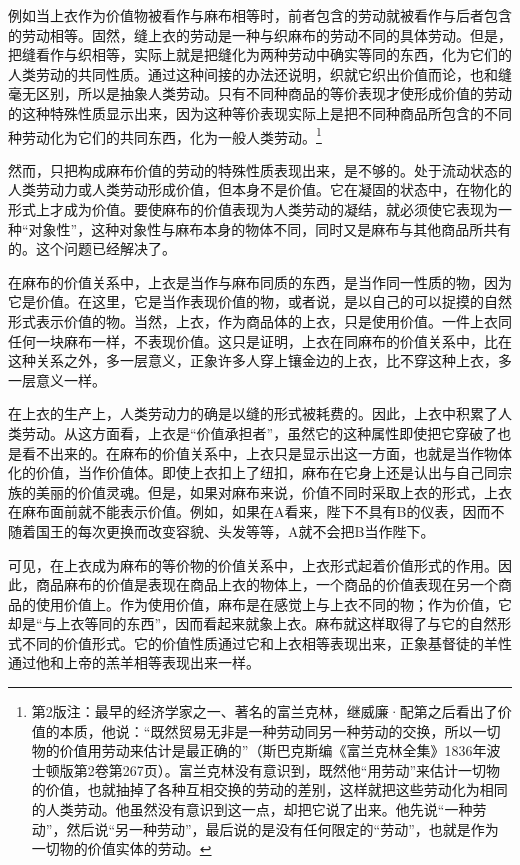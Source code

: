 \documentclass{ctexbook}
\begin{document}
                例如当上衣作为价值物被看作与麻布相等时，前者包含的劳动就被看作与后者包含的劳动相等。固然，缝上衣的劳动是一种与织麻布的劳动不同的具体劳动。但是，把缝看作与织相等，实际上就是把缝化为两种劳动中确实等同的东西，化为它们的人类劳动的共同性质。通过这种间接的办法还说明，织就它织出价值而论，也和缝毫无区别，所以是抽象人类劳动。只有不同种商品的等价表现才使形成价值的劳动的这种特殊性质显示出来，因为这种等价表现实际上是把不同种商品所包含的不同种劳动化为它们的共同东西，化为一般人类劳动。\footnote{第2版注：最早的经济学家之一、著名的富兰克林，继威廉·配第之后看出了价值的本质，他说：“既然贸易无非是一种劳动同另一种劳动的交换，所以一切物的价值用劳动来估计是最正确的”（斯巴克斯编《富兰克林全集》1836年波士顿版第2卷第267页）。富兰克林没有意识到，既然他“用劳动”来估计一切物的价值，也就抽掉了各种互相交换的劳动的差别，这样就把这些劳动化为相同的人类劳动。他虽然没有意识到这一点，却把它说了出来。他先说“一种劳动”，然后说“另一种劳动”，最后说的是没有任何限定的“劳动”，也就是作为一切物的价值实体的劳动。}
                
                然而，只把构成麻布价值的劳动的特殊性质表现出来，是不够的。处于流动状态的人类劳动力或人类劳动形成价值，但本身不是价值。它在凝固的状态中，在物化的形式上才成为价值。要使麻布的价值表现为人类劳动的凝结，就必须使它表现为一种“对象性”，这种对象性与麻布本身的物体不同，同时又是麻布与其他商品所共有的。这个问题已经解决了。
                
                在麻布的价值关系中，上衣是当作与麻布同质的东西，是当作同一性质的物，因为它是价值。在这里，它是当作表现价值的物，或者说，是以自己的可以捉摸的自然形式表示价值的物。当然，上衣，作为商品体的上衣，只是使用价值。一件上衣同任何一块麻布一样，不表现价值。这只是证明，上衣在同麻布的价值关系中，比在这种关系之外，多一层意义，正象许多人穿上镶金边的上衣，比不穿这种上衣，多一层意义一样。
                
                在上衣的生产上，人类劳动力的确是以缝的形式被耗费的。因此，上衣中积累了人类劳动。从这方面看，上衣是“价值承担者”，虽然它的这种属性即使把它穿破了也是看不出来的。在麻布的价值关系中，上衣只是显示出这一方面，也就是当作物体化的价值，当作价值体。即使上衣扣上了纽扣，麻布在它身上还是认出与自己同宗族的美丽的价值灵魂。但是，如果对麻布来说，价值不同时采取上衣的形式，上衣在麻布面前就不能表示价值。例如，如果在A看来，陛下不具有B的仪表，因而不随着国王的每次更换而改变容貌、头发等等，A就不会把B当作陛下。
                
                可见，在上衣成为麻布的等价物的价值关系中，上衣形式起着价值形式的作用。因此，商品麻布的价值是表现在商品上衣的物体上，一个商品的价值表现在另一个商品的使用价值上。作为使用价值，麻布是在感觉上与上衣不同的物；作为价值，它却是“与上衣等同的东西”，因而看起来就象上衣。麻布就这样取得了与它的自然形式不同的价值形式。它的价值性质通过它和上衣相等表现出来，正象基督徒的羊性通过他和上帝的羔羊相等表现出来一样。
                
\end{document}
